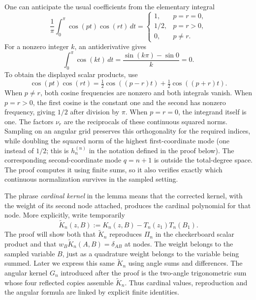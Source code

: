 One can anticipate the usual coefficients from the elementary integral
\[
 \frac1\pi\int_0^\pi\cos(pt)\cos(rt)\,dt
  =\begin{cases}1,&p=r=0,\\1/2,&p=r>0,\\0,&p\ne r.\end{cases}
\]
For a nonzero integer $k$, an antiderivative gives
\[
 \int_0^\pi\cos(kt)\,dt
   =\frac{\sin(k\pi)-\sin0}{k}=0.
\]
To obtain the displayed scalar products, use
\[
 \cos(pt)\cos(rt)
   =\tfrac12\cos((p-r)t)+\tfrac12\cos((p+r)t).
\]
When $p\ne r$, both cosine frequencies are nonzero and both integrals
vanish. When $p=r>0$, the first cosine is the constant one and the
second has nonzero frequency, giving $1/2$ after division by $\pi$.
When $p=r=0$, the integrand itself is one. The factors $\nu_r$ are
the reciprocals of these continuous squared norms. Sampling on an angular grid preserves this orthogonality for
the required indices, while doubling the squared norm of the highest
first-coordinate mode (one instead of $1/2$; this is $h_n^{(n)}$
in the notation defined in the proof below). The corresponding
second-coordinate mode $q=n+1$ is outside the total-degree space. The proof computes it using finite
sums, so it also verifies exactly which continuous normalization survives
in the sampled setting.

The phrase \emph{cardinal kernel} in the lemma means that the corrected
kernel, with the weight of its second node attached, produces the
cardinal polynomial for that node. More explicitly, write temporarily
\[
 \widetilde K_n(z,B):=K_n(z,B)-T_n(z_1)T_n(B_1).
\]
The proof will show both that $\widetilde K_n$ reproduces $\Pi_n$ in the
checkerboard scalar product and that $w_B \widetilde K_n(A,B)=\delta_{AB}$ at
nodes. The weight belongs to the sampled variable $B$, just as a
quadrature weight belongs to the variable being summed. Later we
express this same $\widetilde K_n$ using angle sums and differences. The angular
kernel $G_n$ introduced after the proof is the two-angle trigonometric
sum whose four reflected copies assemble $\widetilde K_n$. Thus
cardinal values, reproduction and the angular formula are linked by
explicit finite identities.

